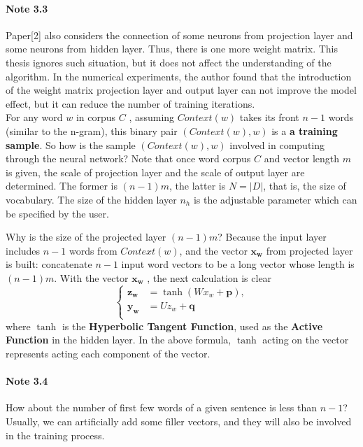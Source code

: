 \paragraph{Note 3.3} Paper[2] also considers the connection of some neurons from projection layer and some neurons from hidden layer. Thus, there is one more weight matrix. This thesis ignores such situation, but it does not affect the understanding of the algorithm. In the numerical experiments, the author found that the introduction of the weight matrix projection layer and output layer can not improve the model effect, but it can reduce the number of training iterations.\\

For any word $w$ in corpus $C$ , assuming $Context(w)$ takes its front $n-1$ words (similar to the n-gram), this binary pair $(Context (w), w)$ is a \textbf{a training sample}. So how is the sample $(Context (w), w)$ involved in computing through the neural network? Note that once word corpus $C$ and vector length $m$ is given, the scale of projection layer and the scale of output layer are determined. The former is $(n-1)m$, the latter is $N=|D|$, that is, the size of vocabulary. The size of the hidden layer $n_h$ is the adjustable parameter which can be specified by the user.

Why is the size of the projected layer $(n-1)m$? Because the input layer includes $n-1$ words from $Context(w)$, and the vector $\mathbf{x_w}$ from projected layer is built: concatenate $n-1$ input word vectors to be a long vector whose length is $(n-1)m$. With the vector $\mathbf{x_w}$ , the next calculation is clear
$$ \left\{
\begin{aligned}
\mathbf{z_w} & =  \tanh(W x_w+\mathbf{p}),\\
\mathbf{y_w} & =  U z_w + \mathbf{q}\\
\end{aligned}
\right.
$$
where $\tanh$ is the \textbf{Hyperbolic Tangent Function}, used as the \textbf{Active Function} in the hidden layer. In the above formula, $\tanh$ acting on the vector represents acting each component of the vector.

\paragraph{Note 3.4} How about the number of first few words of a given sentence is less than $n-1$? Usually, we can artificially add some filler vectors, and they will also be involved in the training process.\\


